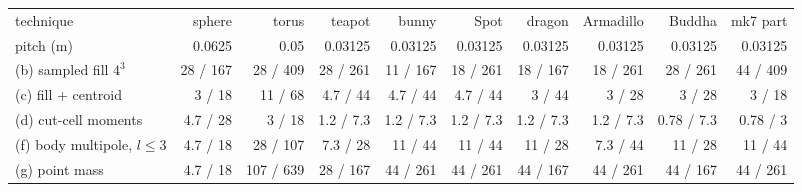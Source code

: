 \begin{tabular}{lrrrrrrrrr}
\toprule
technique & sphere & torus & teapot & bunny & Spot & dragon & Armadillo & Buddha & mk7 part \\
pitch (m) & 0.0625 & 0.05 & 0.03125 & 0.03125 & 0.03125 & 0.03125 & 0.03125 & 0.03125 & 0.03125 \\
\midrule
(b) sampled fill $4^3$ & 28 / 167 & 28 / 409 & 28 / 261 & 11 / 167 & 18 / 261 & 18 / 167 & 18 / 261 & 28 / 261 & 44 / 409 \\
(c) fill + centroid & 3 / 18 & 11 / 68 & 4.7 / 44 & 4.7 / 44 & 4.7 / 44 & 3 / 44 & 3 / 28 & 3 / 28 & 3 / 18 \\
(d) cut-cell moments & 4.7 / 28 & 3 / 18 & 1.2 / 7.3 & 1.2 / 7.3 & 1.2 / 7.3 & 1.2 / 7.3 & 1.2 / 7.3 & 0.78 / 7.3 & 0.78 / 3 \\
(f) body multipole, $l\leq3$ & 4.7 / 18 & 28 / 107 & 7.3 / 28 & 11 / 44 & 11 / 44 & 11 / 28 & 7.3 / 44 & 11 / 28 & 11 / 44 \\
(g) point mass & 4.7 / 18 & 107 / 639 & 28 / 167 & 44 / 261 & 44 / 261 & 44 / 167 & 44 / 261 & 44 / 167 & 44 / 261 \\
\bottomrule
\end{tabular}
